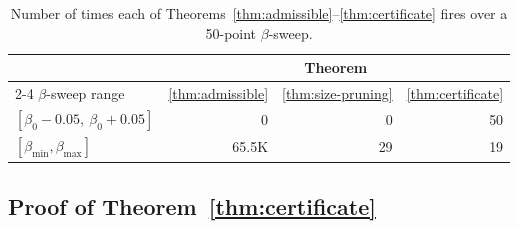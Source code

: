\documentclass[11pt]{article}
\begin{document}
\begin{table}[t]
\centering
\begin{tabular}{l rrr}
\toprule
& \multicolumn{3}{c}{Theorem} \\
\cmidrule(lr){2-4}
$\beta$-sweep range & \ref{thm:admissible} & \ref{thm:size-pruning} & \ref{thm:certificate} \\
\midrule
$[\beta_0{-}0.05,\ \beta_0{+}0.05]$ & 0 & 0 & 50 \\
$[\beta_{\min}, \beta_{\max}]$ & 65.5K & 29 & 19 \\
\bottomrule
\end{tabular}
\caption{Number of times each of Theorems~\ref{thm:admissible}--\ref{thm:certificate} fires over a 50-point $\beta$-sweep.}
\label{tab:solve-exact-theorem-invocations}
\end{table}

\subsection{Proof of Theorem~\ref{thm:certificate}}
\label{app:proof-certificate}

\theoremcertificate*
\end{document}
